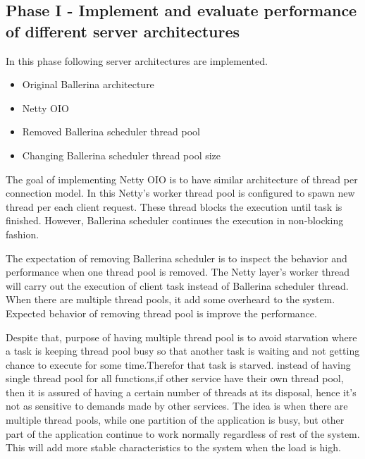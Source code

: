 \subsection{Phase I - Implement and evaluate performance of different server architectures}

In this phase following server architectures are implemented. 

 \begin{itemize}
 	\item Original Ballerina architecture
 	\item Netty OIO
 	\item Removed Ballerina scheduler thread pool
 	\item Changing Ballerina scheduler thread pool size
 \end{itemize} 

The goal of implementing Netty OIO is to have similar architecture of thread per connection model. In this Netty's worker thread pool is configured to spawn new thread per each client request. These thread blocks the execution until task is finished. However, Ballerina scheduler continues the execution in non-blocking fashion.

The expectation of removing Ballerina scheduler is to  inspect the behavior and performance when one thread pool is removed. The Netty layer's worker thread will carry out the execution of client task instead of Ballerina scheduler thread. When there are multiple thread pools, it add some overheard to the system. Expected behavior of removing thread pool is improve the performance. 

Despite that, purpose of having multiple thread pool is to avoid starvation where a task is keeping thread pool busy so that another task is waiting and not getting chance to execute for some time.Therefor that task is starved. instead of having single thread pool for all functions,if other service have their own thread pool, then it is assured of having a certain number of threads at its disposal, hence it's not as sensitive to demands made by other services. The idea is when there are multiple thread pools, while one partition of the application is busy, but other part of the application continue to work normally regardless of rest of the system. This will add more stable characteristics to the system when the load is high.

%

